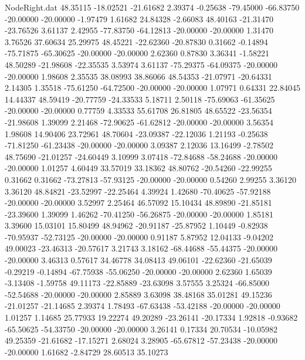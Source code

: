 \begin{filecontents}{NodeRight.dat}
  48.35115  -18.02521  -21.61682     2.39374   -0.25638  -79.45000  -66.83750  -20.00000  -20.00000   -1.97479    1.61682   24.84328   -2.66083
  48.40163  -21.31470  -23.76526     3.61137    2.42955  -77.83750  -64.12813  -20.00000  -20.00000    1.31470    3.76526   37.60634   25.29975
  48.45221  -22.62360  -20.87830     0.31662   -0.14894  -75.71875  -65.30625  -20.00000  -20.00000    2.62360    0.87830    3.36341   -1.58221
  48.50289  -21.98608  -22.35535     3.53974    3.61137  -75.29375  -64.09375  -20.00000  -20.00000    1.98608    2.35535   38.08993   38.86066
  48.54353  -21.07971  -20.64331     2.14305    1.35518  -75.61250  -64.72500  -20.00000  -20.00000    1.07971    0.64331   22.84045   14.44337
  48.59419  -20.77759  -24.33533     5.18711    2.50118  -75.69063  -61.35625  -20.00000  -20.00000    0.77759    4.33533   55.61708   26.81805
  48.65522  -23.56354  -21.98608     1.39099    2.21468  -72.90625  -61.62812  -20.00000  -20.00000    3.56354    1.98608   14.90406   23.72961
  48.70604  -23.09387  -22.12036     1.21193   -0.25638  -71.81250  -61.23438  -20.00000  -20.00000    3.09387    2.12036   13.16499   -2.78502
  48.75690  -21.01257  -24.60449     3.10999    3.07418  -72.84688  -58.24688  -20.00000  -20.00000    1.01257    4.60449   33.57019   33.18362
  48.80762  -20.54260  -22.99255     0.31662    0.31662  -73.27813  -57.93125  -20.00000  -20.00000    0.54260    2.99255    3.36120    3.36120
  48.84821  -23.52997  -22.25464     4.39924    1.42680  -70.40625  -57.92188  -20.00000  -20.00000    3.52997    2.25464   46.57092   15.10434
  48.89890  -21.85181  -23.39600     1.39099    1.46262  -70.41250  -56.26875  -20.00000  -20.00000    1.85181    3.39600   15.03101   15.80499
  48.94962  -20.91187  -25.87952     1.10449   -0.82938  -70.95937  -52.73125  -20.00000  -20.00000    0.91187    5.87952   12.04133   -9.04202
  49.00023  -23.46313  -20.57617     3.21743    3.18162  -68.44688  -55.44375  -20.00000  -20.00000    3.46313    0.57617   34.46778   34.08413
  49.06101  -22.62360  -21.65039    -0.29219   -0.14894  -67.75938  -55.06250  -20.00000  -20.00000    2.62360    1.65039   -3.13408   -1.59758
  49.11173  -22.85889  -23.63098     3.57555    3.25324  -66.85000  -52.54688  -20.00000  -20.00000    2.85889    3.63098   38.48168   35.01281
  49.15236  -21.01257  -21.14685     2.39374    1.78493  -67.63438  -53.42188  -20.00000  -20.00000    1.01257    1.14685   25.77933   19.22274
  49.20289  -23.26141  -20.17334     1.92818   -0.93682  -65.50625  -54.33750  -20.00000  -20.00000    3.26141    0.17334   20.70534  -10.05982
  49.25359  -21.61682  -17.15271     2.68024    3.28905  -65.67812  -57.23438  -20.00000  -20.00000    1.61682   -2.84729   28.60513   35.10273

\end{filecontents}
